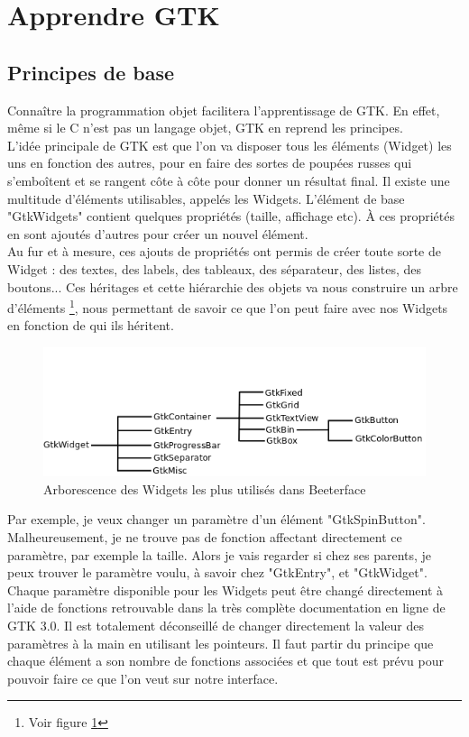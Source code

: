 \documentclass[11pt,french,a4paper]{report}
\begin{document}
\section{Apprendre GTK}
    \subsection{Principes de base}
Connaître la programmation objet facilitera l'apprentissage de GTK. En effet, même si le C n'est pas un langage objet,
GTK en reprend les principes. \\
L'idée principale de GTK est que l'on va disposer tous les éléments (Widget) les uns en fonction des autres, pour en faire des sortes de 
poupées russes qui s'emboîtent et se rangent côte à côte pour donner un résultat final. Il existe une multitude d'éléments utilisables, 
appelés les Widgets. L'élément de base "GtkWidgets" contient quelques propriétés (taille, affichage etc). 
À ces propriétés en sont ajoutés d'autres pour créer un nouvel élément. \\
Au fur et à mesure, ces ajouts de propriétés ont permis de créer toute sorte de Widget : des textes, des labels, des tableaux, 
des séparateur, des listes, des boutons... 
Ces héritages et cette hiérarchie des objets va nous construire un arbre d'éléments \footnote{Voir figure \ref{arbo_widg}}, 
nous permettant de savoir ce que l'on peut faire avec nos Widgets en fonction de qui ils héritent. 
\begin{figure} [h!]
    \centering
        \includegraphics[scale=0.7]{../images/dia/arbo_widget.png} 
        \caption{Arborescence des Widgets les plus utilisés dans Beeterface}
        \label{arbo_widg}
\end{figure}
Par exemple, je veux changer un paramètre d'un élément "GtkSpinButton". Malheureusement, je ne trouve pas de fonction 
affectant directement ce paramètre, par exemple la taille. Alors je vais regarder si chez ses parents, je peux trouver 
le paramètre voulu, à savoir chez "GtkEntry", et "GtkWidget". \\
Chaque paramètre disponible pour les Widgets peut être changé directement à l'aide de fonctions retrouvable dans la très complète 
documentation en ligne de GTK 3.0. Il est totalement déconseillé de changer directement la valeur des paramètres à la main 
en utilisant les pointeurs. Il faut partir du principe que chaque élément a son nombre de fonctions associées 
et que tout est prévu pour pouvoir faire ce que l'on veut sur notre interface. \\ 
\end{document}
